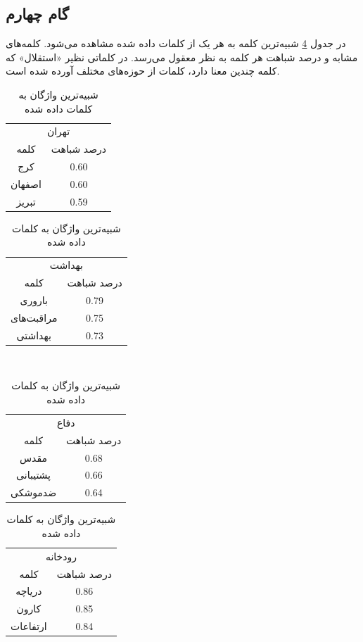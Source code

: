 \documentclass[12pt, a4paper]{article}
\begin{document}
\pagebreak

\subsection*{گام چهارم}

در جدول \ref{similar_words} شبیه‌ترین کلمه به هر یک از کلمات داده شده مشاهده می‌شود.
کلمه‌های مشابه و درصد شباهت هر کلمه به نظر معقول می‌رسد. در کلماتی نظیر «استقلال» که
کلمه چندین معنا دارد، کلمات از حوزه‌های مختلف آورده شده است.

\begin{table}[h]
    \caption{شبیه‌ترین واژگان به کلمات داده شده}
    \label{similar_words}
    \hfil
    \begin{tabular}{c|c}
        \multicolumn{2}{c}{\cellcolor{blue!25}تهران} \\[5pt]
        کلمه & درصد شباهت \\  \hline
        کرج & 0.60 \\
        اصفهان & 0.60 \\
        تبریز & 0.59
    \end{tabular}
    \hfil
    \begin{tabular}{c|c}
        \multicolumn{2}{c}{\cellcolor{blue!25}بهداشت} \\[5pt]
        کلمه & درصد شباهت \\ \hline
        باروری & 0.79 \\
        مراقبت‌های & 0.75 \\
        بهداشتی & 0.73
    \end{tabular}
    \\[10   pt]
    \smallskip
    \hfil
    \begin{tabular}{c|c}
        \multicolumn{2}{c}{\cellcolor{blue!25}دفاع} \\[5pt]
        کلمه & درصد شباهت \\ \hline
        مقدس & 0.68 \\
        پشتیبانی & 0.66 \\
        ضدموشکی & 0.64
    \end{tabular}
    \hfil
    \begin{tabular}{c|c}
        \multicolumn{2}{c}{\cellcolor{blue!25}رودخانه} \\[5pt]
        کلمه & درصد شباهت \\ \hline
        دریاچه & 0.86 \\
        کارون & 0.85 \\
        ارتفاعات & 0.84
    \end{tabular}

\end{table}
\end{document}
